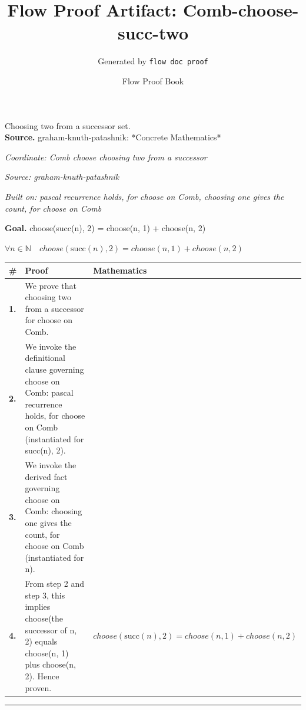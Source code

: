 \documentclass[11pt]{article}
\title{Flow Proof Artifact: Comb-choose-succ-two}
\author{Generated by \texttt{flow doc proof}}
\date{Flow Proof Book}
\theoremstyle{definition}
\begin{document}
\maketitle
Choosing two from a successor set.\\[0.5em]
\textbf{Source.} graham-knuth-patashnik: *Concrete Mathematics*\\[0.5em]
\bigskip
{}\par
\smallskip\noindent\textit{Coordinate: Comb \cdot choose \cdot choosing two from a successor}\par
\smallskip\noindent\textit{Source: graham-knuth-patashnik}\par
\smallskip\noindent\textit{Built on: pascal recurrence holds, for choose on Comb, choosing one gives the count, for choose on Comb}\par
\medskip
\noindent\textbf{Goal.} choose(succ(n), 2) = choose(n, 1) + choose(n, 2)\par
\noindent$\displaystyle \forall n \in \mathbb{N}\quad choose(\mathrm{succ}(n), 2) = choose(n, 1) + choose(n, 2)$\par
\medskip
\noindent
\begin{tabular}{@{} >{\raggedright\arraybackslash}p{} >{\raggedright\arraybackslash}p{} >{\raggedleft\arraybackslash}p{} @{}}
\textbf{\#} & \textbf{Proof} & \textbf{Mathematics} \\
\midrule
\textbf{1.} & We prove that choosing two from a successor for choose on Comb. & \\[0.45em]
\textbf{2.} & We invoke the definitional clause governing choose on Comb: pascal recurrence holds, for choose on Comb (instantiated for succ(n), 2). & \\[0.45em]
\textbf{3.} & We invoke the derived fact governing choose on Comb: choosing one gives the count, for choose on Comb (instantiated for n). & \\[0.45em]
\textbf{4.} & From step 2 and step 3, this implies choose(the successor of n, 2) equals choose(n, 1) plus choose(n, 2). Hence proven. & $\displaystyle choose(\mathrm{succ}(n), 2) = choose(n, 1) + choose(n, 2)$ \\[0.45em]
\bottomrule
\end{tabular}
\label{thm:Comb-choose-choosing_two_from_a_successor}
\par\medskip\hrule
\end{document}
